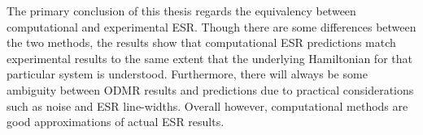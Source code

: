 \documentclass[oneside, astronomy, noacknowlegments]{BYUPhys}
\begin{document}
The primary conclusion of this thesis regards the equivalency between computational and experimental ESR. Though there are some differences between the two methods, the results show that computational ESR predictions match experimental results to the same extent that the underlying Hamiltonian for that particular system is understood. Furthermore, there will always be some ambiguity between ODMR results and predictions due to practical considerations such as noise and ESR line-widths. Overall however, computational methods are good approximations of actual ESR results.
\end{document}
